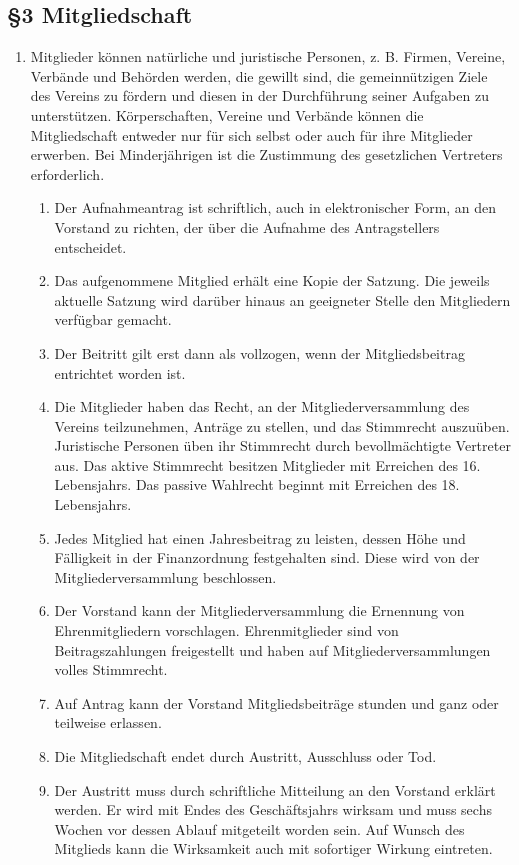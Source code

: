 \documentclass[12pt,a4paper]{article}
\begin{document}
\subsection*{§3 Mitgliedschaft}
\begin{enumerate}
\item Mitglieder können natürliche und juristische Personen, z. B. Firmen, Vereine, Verbände und Behörden werden, die gewillt sind, die gemeinnützigen Ziele des Vereins zu fördern und diesen in der Durchführung seiner Aufgaben zu unterstützen. Körperschaften, Vereine und Verbände können die Mitgliedschaft entweder nur für sich selbst oder auch für ihre Mitglieder erwerben. Bei Minderjährigen ist die Zustimmung des gesetzlichen Vertreters erforderlich.
\begin{enumerate}
\item Der Aufnahmeantrag ist schriftlich, auch in elektronischer Form, an den Vorstand zu richten, der über die Aufnahme des Antragstellers entscheidet.
\item Das aufgenommene Mitglied erhält eine Kopie der Satzung. Die jeweils aktuelle Satzung wird darüber hinaus an geeigneter Stelle den Mitgliedern verfügbar gemacht.
\item Der Beitritt gilt erst dann als vollzogen, wenn der Mitgliedsbeitrag entrichtet worden ist.
\item Die Mitglieder haben das Recht, an der Mitgliederversammlung des Vereins teilzunehmen, Anträge zu stellen, und das Stimmrecht auszuüben. Juristische Personen üben ihr Stimmrecht durch bevollmächtigte Vertreter aus. Das aktive Stimmrecht besitzen Mitglieder mit Erreichen des 16. Lebensjahrs. Das passive Wahlrecht beginnt mit Erreichen des 18. Lebensjahrs.
\item Jedes Mitglied hat einen Jahresbeitrag zu leisten, dessen Höhe und Fälligkeit in der Finanzordnung festgehalten sind. Diese wird von der Mitgliederversammlung beschlossen.
\item Der Vorstand kann der Mitgliederversammlung die Ernennung von Ehrenmitgliedern vorschlagen. Ehrenmitglieder sind von Beitragszahlungen freigestellt und haben auf Mitgliederversammlungen volles Stimmrecht.
\item Auf Antrag kann der Vorstand Mitgliedsbeiträge stunden und ganz oder teilweise erlassen.
\item Die Mitgliedschaft endet durch Austritt, Ausschluss oder Tod.
\item Der Austritt muss durch schriftliche Mitteilung an den Vorstand erklärt werden. Er wird mit Endes des Geschäftsjahrs wirksam und muss sechs Wochen vor dessen Ablauf mitgeteilt worden sein. Auf Wunsch des Mitglieds kann die Wirksamkeit auch mit sofortiger Wirkung eintreten.

\end{enumerate}
\end{enumerate}
\end{document}
